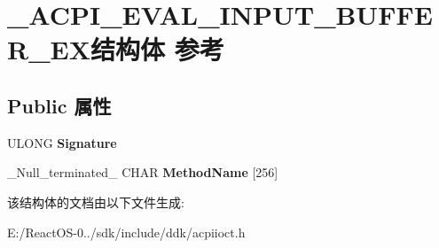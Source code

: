 \hypertarget{struct___a_c_p_i___e_v_a_l___i_n_p_u_t___b_u_f_f_e_r___e_x}{}\section{\+\_\+\+A\+C\+P\+I\+\_\+\+E\+V\+A\+L\+\_\+\+I\+N\+P\+U\+T\+\_\+\+B\+U\+F\+F\+E\+R\+\_\+\+E\+X结构体 参考}
\label{struct___a_c_p_i___e_v_a_l___i_n_p_u_t___b_u_f_f_e_r___e_x}
\subsection*{Public 属性}
\begin{DoxyCompactItemize}
\item 
\mbox{\label{struct___a_c_p_i___e_v_a_l___i_n_p_u_t___b_u_f_f_e_r___e_x_abfdc0577ddbc2786bafda2fdfe324ef8}} 
U\+L\+O\+NG {\bfseries Signature}
\item 
\mbox{\label{struct___a_c_p_i___e_v_a_l___i_n_p_u_t___b_u_f_f_e_r___e_x_a2f5b896e3496de65482ce4d963a6a123}} 
\+\_\+\+Null\+\_\+terminated\+\_\+ C\+H\+AR {\bfseries Method\+Name} \mbox{[}256\mbox{]}
\end{DoxyCompactItemize}


该结构体的文档由以下文件生成\+:\begin{DoxyCompactItemize}
\item 
E\+:/\+React\+O\+S-\/0../sdk/include/ddk/acpiioct.\+h\end{DoxyCompactItemize}
